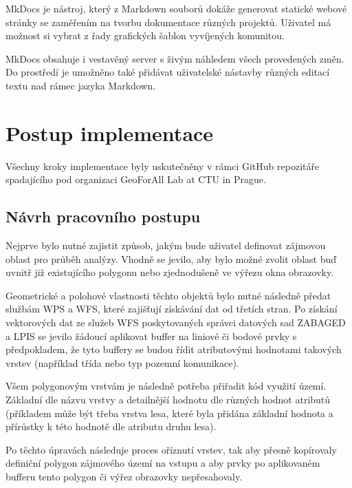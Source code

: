 \documentclass[a4paper,oneside,12pt]{book}
\begin{document}
\hspace{10mm} MkDocs je nástroj, který z Markdown souborů dokáže generovat statické webové stránky se zaměřením na tvorbu dokumentace různých projektů. Uživatel má možnost si vybrat z řady grafických šablon vyvíjených komunitou.

\hspace{10mm}MkDocs obsahuje i vestavěný server s živým náhledem všech provedených změn. Do prostředí je umožněno také přidávat uživatelské nástavby různých editací textu nad rámec jazyka Markdown.


\chapter{Postup implementace} \label{implementace}
\hspace{10mm}Všechny kroky implementace byly uskutečněny v rámci GitHub repozitáře spadajícího pod organizaci GeoForAll Lab at CTU in Prague.

\section{Návrh pracovního postupu} \label{workflow}
\hspace{10mm}Nejprve bylo nutné zajistit způsob, jakým bude uživatel definovat zájmovou oblast pro průběh analýzy. Vhodně se jevilo, aby bylo možné zvolit oblast buď uvnitř již existujícího polygonu nebo zjednodušeně ve výřezu okna obrazovky.

\hspace{10mm}Geometrické a polohové vlastnosti těchto objektů bylo nutné následně předat službám WPS a WFS, které zajišťují získávání dat od třetích stran. Po získání vektorových dat ze služeb WFS poskytovaných správci datových sad ZABAGED a LPIS se jevilo žádoucí aplikovat buffer na liniové či bodové prvky s předpokladem, že tyto buffery se budou řídit atributovými hodnotami takových vrstev (například třída nebo typ pozemní komunikace). 

\hspace{10mm}Všem polygonovým vrstvám je následně potřeba přiřadit kód využití území. Základní dle názvu vrstvy a detailnější hodnotu dle různých hodnot atributů (příkladem může být třeba vrstva lesa, které byla přidána základní hodnota a přírůstky k této hodnotě dle atributu druhu lesa).

\hspace{10mm}Po těchto úpravách následuje proces oříznutí vrstev, tak aby přesně kopírovaly definiční polygon zájmového území na vstupu a aby prvky po aplikovaném bufferu tento polygon či výřez obrazovky nepřesahovaly.
\end{document}
